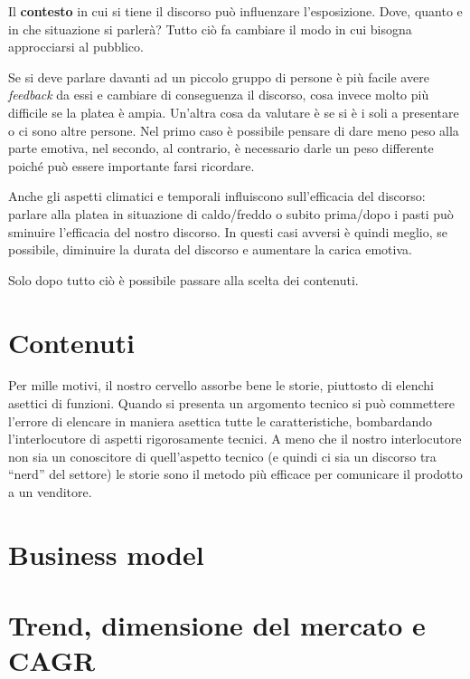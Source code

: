 Il \textbf{contesto} in cui si tiene il discorso può influenzare l'esposizione.
Dove, quanto e in che situazione si parlerà?
Tutto ciò fa cambiare il modo in cui bisogna approcciarsi al pubblico.

Se si deve parlare davanti ad un piccolo gruppo di persone è più facile avere
\emph{feedback} da essi e cambiare di conseguenza il discorso, cosa invece
molto più difficile se la platea è ampia. Un'altra cosa da valutare è se si è
i soli a presentare o ci sono altre persone. Nel primo caso è possibile pensare
di dare meno peso alla parte emotiva, nel secondo, al contrario, è necessario
darle un peso differente poiché può essere importante farsi ricordare.

Anche gli aspetti climatici e temporali influiscono sull'efficacia del
discorso: parlare alla platea in situazione di caldo/freddo o subito prima/dopo
i pasti può sminuire l'efficacia del nostro discorso. In questi casi avversi è
quindi meglio, se possibile, diminuire la durata del discorso e aumentare la
carica emotiva.

Solo dopo tutto ciò è possibile passare alla scelta dei contenuti.

\section{Contenuti}


Per mille motivi, il nostro cervello assorbe bene le storie, piuttosto di
elenchi asettici di funzioni. Quando si presenta un argomento tecnico si può
commettere l'errore di elencare in maniera asettica tutte le caratteristiche,
bombardando l'interlocutore di aspetti rigorosamente tecnici. A meno che il
nostro interlocutore non sia un conoscitore di quell'aspetto tecnico (e quindi
ci sia un discorso tra ``nerd'' del settore) le storie sono il metodo più
efficace per comunicare il prodotto a un venditore.

\section{Business model}


\section{Trend, dimensione del mercato e CAGR}


